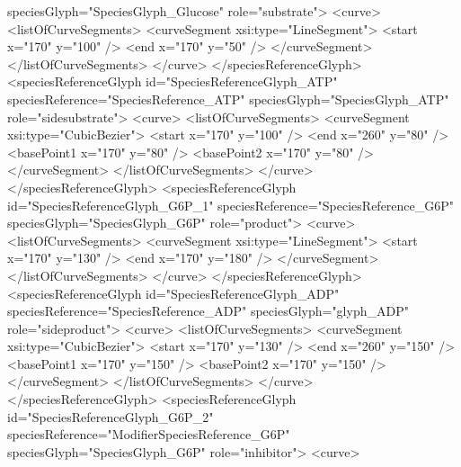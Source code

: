 \begin{example}
                            speciesGlyph="SpeciesGlyph_Glucose" role="substrate">
                <curve>
                  <listOfCurveSegments>
                    <curveSegment xsi:type="LineSegment">
                      <start x="170" y="100" />
                      <end x="170" y="50" />
                    </curveSegment>
                  </listOfCurveSegments>
                </curve>
              </speciesReferenceGlyph>
              <speciesReferenceGlyph id="SpeciesReferenceGlyph_ATP" 
                            speciesReference="SpeciesReference_ATP"
                            speciesGlyph="SpeciesGlyph_ATP" role="sidesubstrate">
                <curve>
                  <listOfCurveSegments>
                    <curveSegment xsi:type="CubicBezier">
                      <start x="170" y="100" />
                      <end x="260" y="80" />
                      <basePoint1 x="170" y="80" />
                      <basePoint2 x="170" y="80" />
                    </curveSegment>
                  </listOfCurveSegments>
                </curve>
              </speciesReferenceGlyph>
              <speciesReferenceGlyph id="SpeciesReferenceGlyph_G6P_1"
                              speciesReference="SpeciesReference_G6P"
                              speciesGlyph="SpeciesGlyph_G6P" role="product">
                <curve>
                  <listOfCurveSegments>
                    <curveSegment xsi:type="LineSegment">
                      <start x="170" y="130" />
                      <end x="170" y="180" />
                    </curveSegment>
                  </listOfCurveSegments>
                </curve>
              </speciesReferenceGlyph>
              <speciesReferenceGlyph id="SpeciesReferenceGlyph_ADP"
                            speciesReference="SpeciesReference_ADP"
                            speciesGlyph="glyph_ADP" role="sideproduct">
                <curve>
                  <listOfCurveSegments>
                    <curveSegment xsi:type="CubicBezier">
                      <start x="170" y="130" />
                      <end x="260" y="150" />
                      <basePoint1 x="170" y="150" />
                      <basePoint2 x="170" y="150" />
                    </curveSegment>
                  </listOfCurveSegments>
                </curve>
              </speciesReferenceGlyph>
              <speciesReferenceGlyph id="SpeciesReferenceGlyph_G6P_2"
                      speciesReference="ModifierSpeciesReference_G6P"
                      speciesGlyph="SpeciesGlyph_G6P" role="inhibitor">
                <curve>

\end{example}
